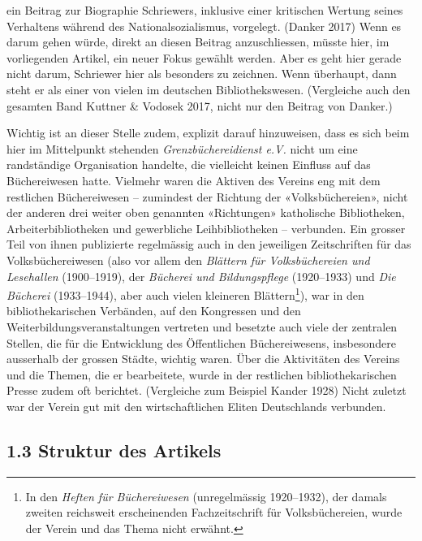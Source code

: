 \documentclass[a4paper,
fontsize=11pt,
oneside,
numbers=noperiodatend,
parskip=half-,
bibliography=totoc,
final
]{scrartcl}
\begin{document}
ein Beitrag zur Biographie Schriewers, inklusive einer kritischen
Wertung seines Verhaltens während des Nationalsozialismus, vorgelegt.
(Danker 2017) Wenn es darum gehen würde, direkt an diesen Beitrag
anzuschliessen, müsste hier, im vorliegenden Artikel, ein neuer Fokus
gewählt werden. Aber es geht hier gerade nicht darum, Schriewer hier als
besonders zu zeichnen. Wenn überhaupt, dann steht er als einer von
vielen im deutschen Bibliothekswesen. (Vergleiche auch den gesamten Band
Kuttner \& Vodosek 2017, nicht nur den Beitrag von Danker.)

Wichtig ist an dieser Stelle zudem, explizit darauf hinzuweisen, dass es
sich beim hier im Mittelpunkt stehenden \emph{Grenzbüchereidienst e.V.}
nicht um eine randständige Organisation handelte, die vielleicht keinen
Einfluss auf das Büchereiwesen hatte. Vielmehr waren die Aktiven des
Vereins eng mit dem restlichen Büchereiwesen -- zumindest der Richtung
der «Volksbüchereien», nicht der anderen drei weiter oben genannten
«Richtungen» katholische Bibliotheken, Arbeiterbibliotheken und
gewerbliche Leihbibliotheken -- verbunden. Ein grosser Teil von ihnen
publizierte regelmässig auch in den jeweiligen Zeitschriften für das
Volksbüchereiwesen (also vor allem den \emph{Blättern für
Volksbüchereien und Lesehallen} (1900--1919), der \emph{Bücherei und
Bildungspflege} (1920--1933) und \emph{Die Bücherei} (1933--1944), aber
auch vielen kleineren Blättern\footnote{In den \emph{Heften für
  Büchereiwesen} (unregelmässig 1920--1932), der damals zweiten
  reichsweit erscheinenden Fachzeitschrift für Volksbüchereien, wurde
  der Verein und das Thema nicht erwähnt.}), war in den
bibliothekarischen Verbänden, auf den Kongressen und den
Weiterbildungsveranstaltungen vertreten und besetzte auch viele der
zentralen Stellen, die für die Entwicklung des Öffentlichen
Büchereiwesens, insbesondere ausserhalb der grossen Städte, wichtig
waren. Über die Aktivitäten des Vereins und die Themen, die er
bearbeitete, wurde in der restlichen bibliothekarischen Presse zudem oft
berichtet. (Vergleiche zum Beispiel Kander 1928) Nicht zuletzt war der
Verein gut mit den wirtschaftlichen Eliten Deutschlands verbunden.

\hypertarget{struktur-des-artikels}{%
\subsection{1.3 Struktur des Artikels}\label{struktur-des-artikels}}
\end{document}
